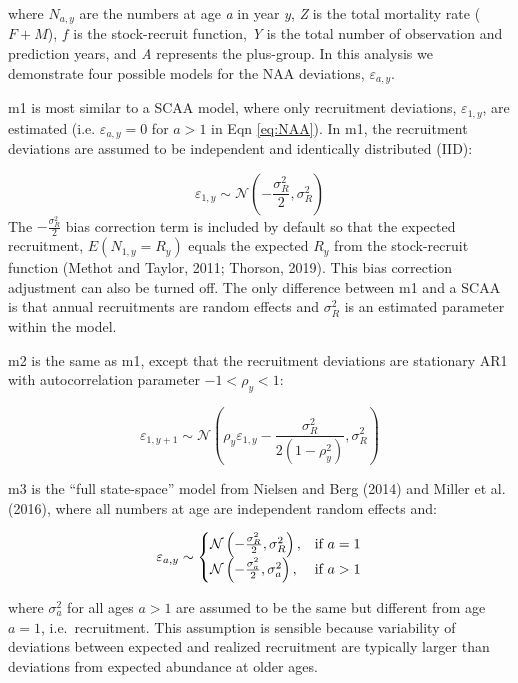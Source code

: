 \documentclass[]{article}
\begin{document}
where \(N_{a,y}\) are the numbers at age \emph{a} in year \emph{y},
\emph{Z} is the total mortality rate (\(F + M\)), \(f\) is the
stock-recruit function, \emph{Y} is the total number of observation and
prediction years, and \emph{A} represents the plus-group. In this
analysis we demonstrate four possible models for the NAA deviations,
\(\varepsilon_{a,y}\).

m1 is most similar to a SCAA model, where only recruitment deviations,
\(\varepsilon_{1,y}\), are estimated (i.e. \(\varepsilon_{a,y} = 0\) for
\(a > 1\) in Eqn \ref{eq:NAA}). In m1, the recruitment deviations are
assumed to be independent and identically distributed (IID):

\[\varepsilon_{1,y} \sim \mathcal{N}\left( - \frac{\sigma^2_R}{2}, \sigma^2_R \right)\]
The \(- \frac{\sigma^2_R}{2}\) bias correction term is included by
default so that the expected recruitment, \(E(N_{1,y} = R_y)\) equals
the expected \(R_y\) from the stock-recruit function (Methot and Taylor,
2011; Thorson, 2019). This bias correction adjustment can also be turned
off. The only difference between m1 and a SCAA is that annual
recruitments are random effects and \(\sigma^2_R\) is an estimated
parameter within the model.

m2 is the same as m1, except that the recruitment deviations are
stationary AR1 with autocorrelation parameter \(-1<\rho_y<1\):

\[\varepsilon_{1,y+1} \sim \mathcal{N}\left(\rho_y \varepsilon_{1,y} - \frac{\sigma^2_R}{2 (1-\rho^2_y)}, \sigma^2_R \right)\]

m3 is the ``full state-space'' model from Nielsen and Berg (2014) and
Miller et al. (2016), where all numbers at age are independent random
effects and:

\begin{equation}
  \varepsilon_{a,y} \sim \left\{
    \begin{array}{@{}ll@{}}
      \mathcal{N} \left( - \frac{\sigma^2_R}{2}, \sigma^2_R \right), & \text{if}\ a = 1 \\
      \mathcal{N} \left( - \frac{\sigma^2_a}{2}, \sigma^2_a \right), & \text{if}\ a > 1
    \end{array}\right.
\end{equation}

where \(\sigma^2_a\) for all ages \(a > 1\) are assumed to be the same
but different from age \(a = 1\), i.e.~recruitment. This assumption is
sensible because variability of deviations between expected and realized
recruitment are typically larger than deviations from expected abundance
at older ages.
\end{document}
